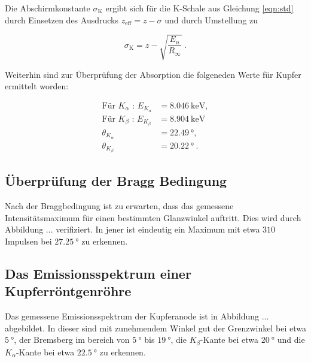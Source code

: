   Die Abschirmkonstante $\sigma_\text{K}$ ergibt sich für die K-Schale aus Gleichung
  \eqref{eqn:std} durch Einsetzen des Ausdrucks $z_\text{eff} = z -\sigma$ und durch 
  Umstellung zu 

  \begin{equation}
    \sigma_\text{K} = z - \sqrt{\frac{E_n}{R_{\infty}}} \; .
    \label{eqn:sigma}
  \end{equation}

  Weiterhin sind zur Überprüfung der Absorption die folgeneden Werte für Kupfer 
  ermittelt worden:

  \begin{align*}
    \text{Für } K_\alpha \text{ : } E_{K_\alpha} &= \SI{8.046}{\kilo\eV}, \\
    \text{Für } K_\beta \text{ : } E_{K_\beta} &= \SI{8.904}{\kilo\eV} \\
    \theta_{K_\alpha} &= \SI{22.49}{\degree}, \\
    \theta_{K_\beta} &= \SI{20.22}{\degree} \: .
 \end{align*}









\subsection{Überprüfung der Bragg Bedingung}

Nach der Braggbedingung ist zu erwarten, dass das gemessene Intensitätsmaximum
für einen bestimmten Glanzwinkel auftritt. 
Dies wird durch Abbildung ... verifiziert. In jener ist eindeutig ein Maximum 
mit etwa $310$ Impulsen bei $\SI{27.25}{\degree}$ zu erkennen.


\subsection{Das Emissionsspektrum einer Kupferröntgenröhre}

Das gemessene Emissionsspektrum der Kupferanode ist in Abbildung ... abgebildet.
In dieser sind mit zunehmendem Winkel gut der Grenzwinkel bei etwa $\SI{5}{\degree}$,
der Bremsberg im bereich von $\SI{5}{\degree}$ bis $\SI{19}{\degree}$, die 
$K_\beta$-Kante bei etwa $\SI{20}{\degree}$ und die $K_\alpha$-Kante bei 
etwa $\SI{22.5}{\degree}$ zu erkennen. 

